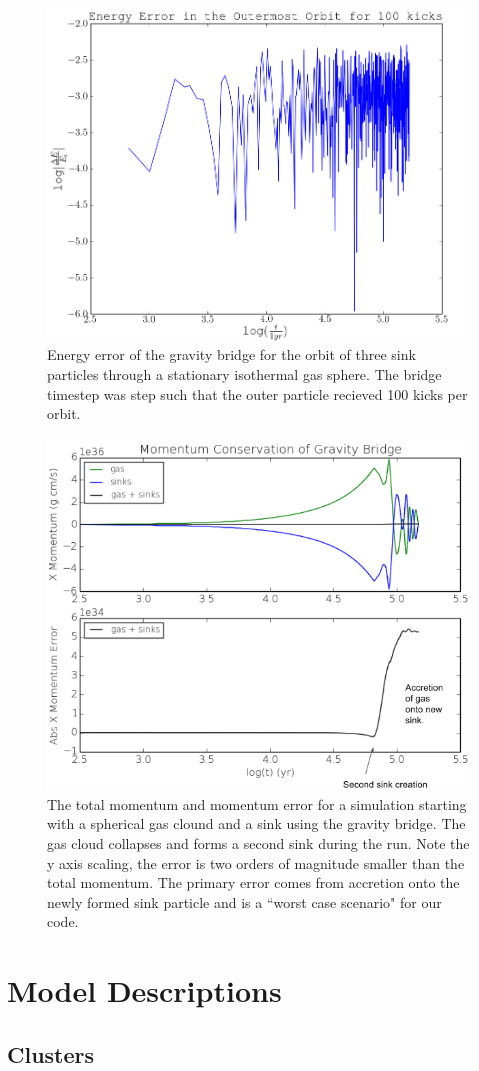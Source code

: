 \documentclass[11pt]{article}
\begin{document}
\begin{figure}
\centering
\includegraphics[width=0.5\linewidth]{ener_mod}
\caption{Energy error of the gravity bridge for the orbit of three sink particles through a stationary isothermal gas sphere. The bridge timestep was step such that the outer particle recieved 100 kicks per orbit.}
\label{fig:ener}
\end{figure}

\begin{figure}
\hspace{-1.0cm}
\centering
\includegraphics[width=0.5\linewidth]{mom_mod}
\caption{The total momentum and momentum error for a simulation starting with a spherical gas clound and a sink using the gravity bridge. The gas cloud collapses and forms a second sink during the run. Note the y axis scaling, the error is two orders of magnitude smaller than the total momentum. The primary error comes from accretion onto the newly formed sink particle and is a ``worst case scenario" for our code.}
\label{fig:mommod}
\end{figure}

\section{Model Descriptions}
\subsection{Clusters}
\end{document}
